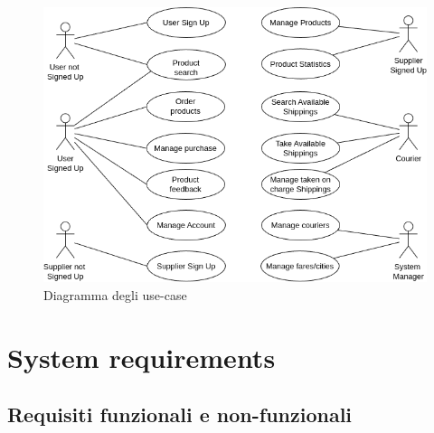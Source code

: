 \documentclass[12pt]{report}
\begin{document}
    \begin{figure}[H]
        \centering
        \includegraphics[scale=0.6]{images/Use-cases.png}
        \caption{Diagramma degli use-case}
        \label{fig:use_cases}
    \end{figure}

    \newpage
    
    \section{System requirements}

    \subsection{Requisiti funzionali e non-funzionali}
\end{document}
